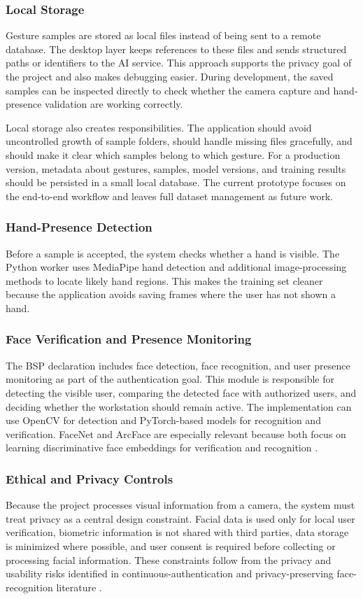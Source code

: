 \documentclass[10pt,twocolumn]{article}
\begin{document}
\subsubsection{Local Storage}
Gesture samples are stored as local files instead of being sent to a remote database.
The desktop layer keeps references to these files and sends structured paths or identifiers to the AI service.
This approach supports the privacy goal of the project and also makes debugging easier.
During development, the saved samples can be inspected directly to check whether the camera capture and hand-presence validation are working correctly.

Local storage also creates responsibilities.
The application should avoid uncontrolled growth of sample folders, should handle missing files gracefully, and should make it clear which samples belong to which gesture.
For a production version, metadata about gestures, samples, model versions, and training results should be persisted in a small local database.
The current prototype focuses on the end-to-end workflow and leaves full dataset management as future work.

\subsubsection{Hand-Presence Detection}
Before a sample is accepted, the system checks whether a hand is visible.
The Python worker uses MediaPipe hand detection and additional image-processing methods to locate likely hand regions.
This makes the training set cleaner because the application avoids saving frames where the user has not shown a hand.

\subsubsection{Face Verification and Presence Monitoring}
The BSP declaration includes face detection, face recognition, and user presence monitoring as part of the authentication goal.
This module is responsible for detecting the visible user, comparing the detected face with authorized users, and deciding whether the workstation should remain active.
The implementation can use OpenCV for detection and PyTorch-based models for recognition and verification.
FaceNet and ArcFace are especially relevant because both focus on learning discriminative face embeddings for verification and recognition \cite{schroff2015facenet,deng2019arcface}.

\subsubsection{Ethical and Privacy Controls}
Because the project processes visual information from a camera, the system must treat privacy as a central design constraint.
Facial data is used only for local user verification, biometric information is not shared with third parties, data storage is minimized where possible, and user consent is required before collecting or processing facial information.
These constraints follow from the privacy and usability risks identified in continuous-authentication and privacy-preserving face-recognition literature \cite{baig2021security,sun2025privacy}.
\end{document}
